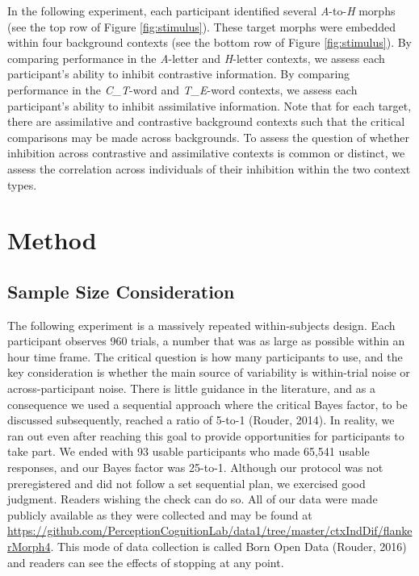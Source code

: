 \documentclass[english,floatsintext,man]{apa6}
\theoremstyle{definition}
\theoremstyle{definition}
\theoremstyle{definition}
\theoremstyle{remark}
\begin{document}
In the following experiment, each participant identified several
\emph{A}-to-\emph{H} morphs (see the top row of Figure
\ref{fig:stimulus}). These target morphs were embedded within four
background contexts (see the bottom row of Figure \ref{fig:stimulus}).
By comparing performance in the \emph{A}-letter and \emph{H}-letter
contexts, we assess each participant's ability to inhibit contrastive
information. By comparing performance in the \emph{C\_T}-word and
\emph{T\_E}-word contexts, we assess each participant's ability to
inhibit assimilative information. Note that for each target, there are
assimilative and contrastive background contexts such that the critical
comparisons may be made across backgrounds. To assess the question of
whether inhibition across contrastive and assimilative contexts is
common or distinct, we assess the correlation across individuals of
their inhibition within the two context types.

\section{Method}\label{method}

\subsection{Sample Size Consideration}\label{sample-size-consideration}

The following experiment is a massively repeated within-subjects design.
Each participant observes 960 trials, a number that was as large as
possible within an hour time frame. The critical question is how many
participants to use, and the key consideration is whether the main
source of variability is within-trial noise or across-participant noise.
There is little guidance in the literature, and as a consequence we used
a sequential approach where the critical Bayes factor, to be discussed
subsequently, reached a ratio of 5-to-1 (Rouder, 2014). In reality, we
ran out even after reaching this goal to provide opportunities for
participants to take part. We ended with 93 usable participants who made
65,541 usable responses, and our Bayes factor was 25-to-1. Although our
protocol was not preregistered and did not follow a set sequential plan,
we exercised good judgment. Readers wishing the check can do so. All of
our data were made publicly available as they were collected and may be
found at
\url{https://github.com/PerceptionCognitionLab/data1/tree/master/ctxIndDif/flankerMorph4}.
This mode of data collection is called Born Open Data (Rouder, 2016) and
readers can see the effects of stopping at any point.
\end{document}
